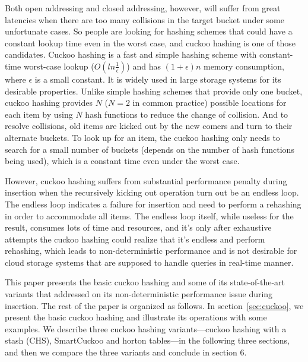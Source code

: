 \documentclass[12pt,conference,compsoc]{IEEEtran}
\begin{document}
Both open addressing and closed addressing, however, will suffer from great latencies when there are too many collisions in the target bucket under some unfortunate cases. So people are looking for hashing schemes that could have a constant lookup time even in the worst case, and cuckoo hashing is one of those candidates. Cuckoo hashing is a fast and simple hashing scheme with constant-time worst-case lookup ($O(ln\frac{1}{\epsilon})$) and has $(1+\epsilon)n$ memory consumption, where $\epsilon$ is a small constant. It is widely used in large storage systems for its desirable properties. Unlike simple hashing schemes that provide only one bucket, cuckoo hashing provides $N$ ($N=2$ in common practice) possible locations for each item by using $N$ hash functions to reduce the change of collision. And to resolve collisions, old items are kicked out by the new comers and turn to their alternate buckets. To look up for an item, the cuckoo hashing only needs to search for a small number of buckets (depends on the number of hash functions being used), which is a constant time even under the worst case.

However, cuckoo hashing suffers from substantial performance penalty during insertion when the recursively kicking out operation turn out be an endless loop. The endless loop indicates a failure for insertion and need to perform a rehashing in order to accommodate all items. The endless loop itself, while useless for the result, consumes lots of time and resources, and it's only after exhaustive attempts the cuckoo hashing could realize that it's endless and perform rehashing, which leads to non-deterministic performance and is not desirable for cloud storage systems that are supposed to handle queries in real-time manner. 

This paper presents the basic cuckoo hashing and some of its state-of-the-art variants that addressed on its non-deterministic performance issue during insertion. The rest of the paper is organized as follows. In section~\ref{sec:cuckoo}, we present the basic cuckoo hashing and illustrate its operations with some examples. We describe three cuckoo hashing variants---cuckoo hashing with a stash (CHS), SmartCuckoo and horton tables---in the following three sections, and then we compare the three variants and conclude in section 6.
\end{document}

